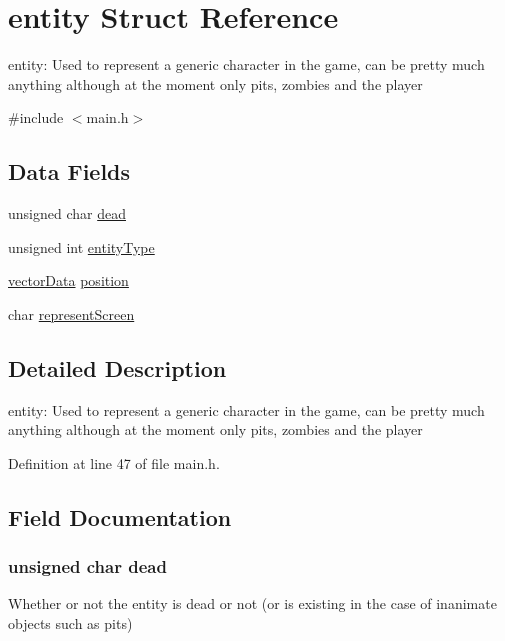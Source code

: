 \hypertarget{structentity}{}\section{entity Struct Reference}
\label{structentity}


entity\+: Used to represent a generic character in the game, can be pretty much anything although at the moment only pits, zombies and the player  




{\ttfamily \#include $<$main.\+h$>$}

\subsection*{Data Fields}
\begin{DoxyCompactItemize}
\item 
unsigned char \hyperlink{structentity_a995ff9cce609a42ec8640f6e1a75560d}{dead}
\item 
unsigned int \hyperlink{structentity_a4bbf274a430246911e0893de70e0ecc2}{entity\+Type}
\item 
\hyperlink{structvector_data}{vector\+Data} \hyperlink{structentity_ab0d5c56202dcdb82d09d9dfd10f01aa7}{position}
\item 
char \hyperlink{structentity_abdf49eaf9c20a9d8c4caf4cb354dc1aa}{represent\+Screen}
\end{DoxyCompactItemize}


\subsection{Detailed Description}
entity\+: Used to represent a generic character in the game, can be pretty much anything although at the moment only pits, zombies and the player 



Definition at line 47 of file main.\+h.



\subsection{Field Documentation}
\hypertarget{structentity_a995ff9cce609a42ec8640f6e1a75560d}{}
\subsubsection[{dead}]{\setlength{\rightskip}{0pt plus 5cm}unsigned char dead}\label{structentity_a995ff9cce609a42ec8640f6e1a75560d}
Whether or not the entity is dead or not (or is existing in the case of inanimate objects such as pits) 

